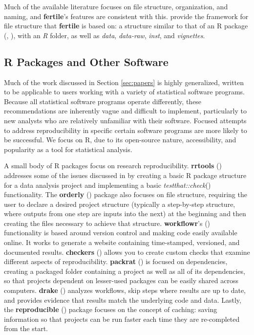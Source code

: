 \documentclass[APA,LATO1COL]{WileyNJD-v2}\usepackage[]{graphicx}\usepackage[]{color}
\newcommand{\R}{\textsf{R}\xspace}
\newcommand{\cmd}[1]{\textit{#1}}
\newcommand{\pkg}[1]{\textbf{#1}}
\newcommand{\func}[1]{\textit{#1}()}
\begin{document}
Much of the available literature focuses on file structure, organization, and naming, and \pkg{fertile}'s features are consistent with this. \cite{marwick2018packaging} provide the framework for file structure that \pkg{fertile} is based on: a structure similar to that of an \R package (\cite{hadley-packages}, \cite{coreteam-extensions}), with an \cmd{R} folder, as well as \cmd{data}, \cmd{data-raw}, \cmd{inst}, and \cmd{vignettes}.

\subsection{R Packages and Other Software}

Much of the work discussed in Section \ref{sec:papers} is highly generalized, written to be applicable to users working with a variety of statistical software programs. Because all statistical software programs operate differently, these recommendations are inherently vague and difficult to implement, particularly to new analysts who are relatively unfamiliar with their software. Focused attempts to address reproducibility in specific certain software programs are more likely to be successful. We focus on \R, due to its open-source nature, accessibility, and popularity as a tool for statistical analysis.

A small body of \R packages focus on research reproducibility. \pkg{rrtools} (\cite{R-rrtools}) addresses some of the issues discussed in \cite{marwick2018packaging} by creating a basic \R package structure for a data analysis project and implementing a basic \func{testthat::check} functionality. The \pkg{orderly} (\cite{R-orderly}) package also focuses on file structure, requiring the user to declare a desired project structure (typically a step-by-step structure, where outputs from one step are inputs into the next) at the beginning and then creating the files necessary to achieve that structure. \pkg{workflowr}'s (\cite{R-workflowr}) functionality is based around version control and making code easily available online. It works to generate a website containing time-stamped, versioned, and documented results. \pkg{checkers} (\cite{R-checkers}) allows you to create custom checks that examine different aspects of reproducibility. \pkg{packrat} (\cite{R-packrat}) is focused on dependencies, creating a packaged folder containing a project as well as all of its dependencies, so that projects dependent on lesser-used packages can be easily shared across computers. \pkg{drake} (\cite{R-drake}) analyzes workflows, skip steps where results are up to date, and provides evidence that results match the underlying code and data. Lastly, the \pkg{reproducible} (\cite{R-reproducible}) package focuses on the concept of caching: saving information so that projects can be run faster each time they are re-completed from the start.
\end{document}
